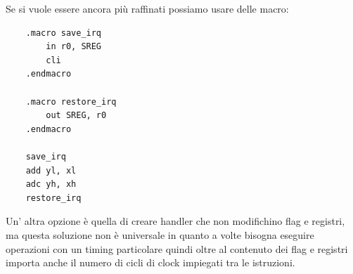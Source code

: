 Se si vuole essere ancora più raffinati possiamo usare delle macro:
\begin{verbatim}
    .macro save_irq
        in r0, SREG
        cli
    .endmacro
    
    .macro restore_irq
        out SREG, r0
    .endmacro
    
    save_irq
    add yl, xl
    adc yh, xh
    restore_irq
\end{verbatim}

Un' altra opzione è quella di creare handler che non modifichino flag e registri, ma questa soluzione non è universale in quanto a volte bisogna eseguire operazioni con un timing particolare quindi oltre al contenuto dei flag e registri importa anche il numero di cicli di clock impiegati tra le istruzioni.